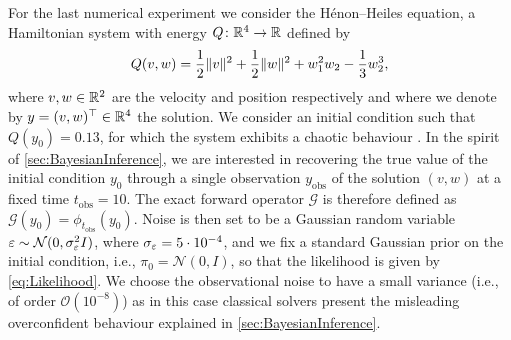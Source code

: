 \documentclass[10pt]{article}
\begin{document}
For the last numerical experiment we consider the Hénon--Heiles equation, a Hamiltonian system with energy $Q\colon \mathbb{R}^4 \to \mathbb{R}$ defined by
\begin{equation}\label{eq:HamHH}
	Q(v, w) = \frac{1}{2}\lVert v\rVert^2 + \frac{1}{2}\lVert w\rVert^2 + w_1^2w_2 - \frac{1}{3}w_2^3,
\end{equation} 
where $v, w \in \mathbb{R}^2$ are the velocity and position respectively and where we denote by $y = (v, w)^\top \in \mathbb{R}^4$ the solution. We consider an initial condition such that $Q(y_0) = 0.13$, for which the system exhibits a chaotic behaviour \cite{HeH64}. In the spirit of \cref{sec:BayesianInference}, we are interested in recovering the true value of the initial condition $y_0$ through a single observation $y_{\mathrm{obs}}$ of the solution $(v, w)$ at a fixed time $t_{\mathrm{obs}} = 10$. The exact forward operator $\mathcal{G}$ is therefore defined as $\mathcal{G}(y_0) = \phi_{t_{\mathrm{obs}}}(y_0)$. Noise is then set to be a Gaussian random variable $\varepsilon \sim \mathcal{N}(0, \sigma_\varepsilon^2 I)$, where $\sigma_\varepsilon = 5 \cdot 10^{-4}$, and we fix a standard Gaussian prior on the initial condition, i.e., $\pi_0 = \mathcal N(0, I)$, so that the likelihood is given by \eqref{eq:Likelihood}. We choose the observational noise to have a small variance (i.e., of order $\mathcal O(10^{-8})$) as in this case classical solvers present the misleading overconfident behaviour explained in \cref{sec:BayesianInference}.
\end{document}
